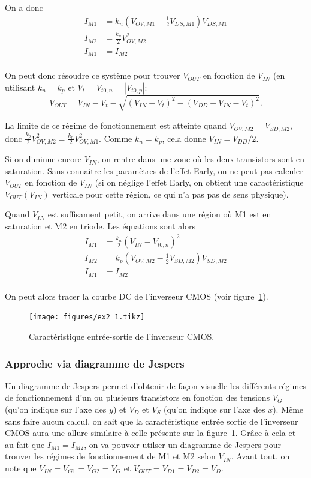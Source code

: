 \documentclass[frenchb,DIV=14]{scrartcl}
\begin{document}
On a donc
\begin{align*}
    I_{M1} &= k_n \left(V_{OV,M1}-\frac{1}{2}V_{DS,M1}\right)V_{DS,M1} \\
    I_{M2} &= \frac{k_p}{2} V_{OV,M2}^2 \\
    I_{M1} &= I_{M2} \\
\end{align*}

On peut donc résoudre ce système pour trouver $V_{OUT}$ en fonction
de $V_{IN}$ (en utilisant $k_n = k_p$ et $V_t = V_{t0,n} = |V_{t0,p}|$:
\[V_{OUT} = V_{IN}-V_t - \sqrt{(V_{IN}-V_t)^2-(V_{DD}-V_{IN}-V_t)^2}.\]

La limite de ce régime de fonctionnement est atteinte quand
$V_{OV,M2} = V_{SD,M2}$, donc $\frac{k_p}{2}V_{OV,M2}^2 = \frac{k_n}{2}V_{OV,M1}^2$.
Comme $k_n = k_p$, cela donne $V_{IN} = V_{DD}/2$.

Si on diminue encore $V_{IN}$, on rentre dans une zone où les deux transistors sont en saturation.
Sans connaitre les paramètres de l'effet Early, on ne peut pas calculer
$V_{OUT}$ en fonction de $V_{IN}$ (si on néglige l'effet Early, on
obtient une caractéristique $V_{OUT}(V_{IN})$ verticale pour cette région,
ce qui n'a pas pas de sens physique).

Quand $V_{IN}$ est suffisament petit, on arrive dans une région où
M1 est en saturation et M2 en triode.
Les équations sont alors
\begin{align*}
    I_{M1} &= \frac{k_n}{2} (V_{IN} - V_{t0,n})^2 \\
    I_{M2} &= k_p \left(V_{OV,M2}-\frac{1}{2}V_{SD,M2}\right)V_{SD,M2} \\
    I_{M1} &= I_{M2} \\
\end{align*}

On peut alors tracer la courbe DC de l'inverseur CMOS (voir figure~\ref{fig:dc-inv}).
\begin{figure}
	\centering
	\texttt{[image: figures/ex2\_1.tikz]}
	\caption{Caractéristique entrée-sortie de l'inverseur CMOS.}
	\label{fig:dc-inv}
\end{figure}

\subsubsection*{Approche via diagramme de Jespers}
Un diagramme de Jespers permet d'obtenir de façon visuelle les différents régimes
de fonctionnement d'un ou plusieurs transistors en fonction des tensions $V_G$
(qu'on indique sur l'axe des $y$) et $V_D$ et $V_S$ (qu'on indique sur l'axe des $x$).
Même sans faire aucun calcul, on sait que la caractéristique entrée sortie de l'inverseur
CMOS aura une allure similaire à celle présente sur la figure~\ref{fig:dc-inv}. Grâce à
cela et au fait que $I_{M1} = I_{M2}$, on va pouvoir utilser un diagramme de Jespers
pour trouver les régimes de fonctionnement de M1 et M2 selon $V_{IN}$. Avant tout, on note
que $V_{IN} = V_{G1} = V_{G2} = V_G$ et $V_{OUT} = V_{D1} = V_{D2} = V_D$.
\end{document}
